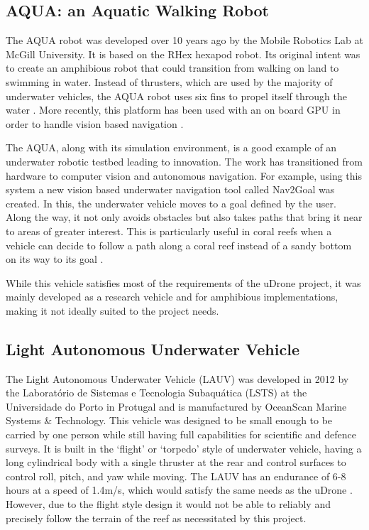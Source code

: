 \subsection{AQUA: an Aquatic Walking Robot}

The AQUA robot was developed over 10 years ago by the  Mobile Robotics Lab at McGill University. It is based on the RHex hexapod robot. Its original intent was to create an amphibious robot that could transition from walking on land to swimming in water. Instead of thrusters, which are used by the majority of underwater vehicles, the AQUA robot uses six fins to propel itself through the water \parencite{aqua}. More recently, this platform has been used with an on board GPU in order to handle vision based navigation \parencite{MandersonGPU}.

The AQUA, along with its simulation environment, is a good example of an underwater robotic testbed leading to innovation. The work has transitioned from hardware to computer vision and autonomous navigation. For example, using this system a new vision based underwater navigation tool called Nav2Goal was created. In this, the underwater vehicle moves to a goal defined by the user. Along the way, it not only avoids obstacles but also takes paths that bring it near to areas of greater interest. This is particularly useful in coral reefs when a vehicle can decide to follow a path along a coral reef instead of a sandy bottom on its way to its goal \parencite{manderson2020visionbased}.

While this vehicle satisfies most of the requirements of the uDrone project, it was mainly developed as a research vehicle and for amphibious implementations, making it not ideally suited to the project needs. 

\subsection{Light Autonomous Underwater Vehicle}
The Light Autonomous Underwater Vehicle (LAUV) was developed in 2012 by the Laboratório de Sistemas e Tecnologia Subaquática (LSTS) at the Universidade do Porto in Protugal and is manufactured by OceanScan Marine Systems \& Technology. This vehicle was designed to be small enough to be carried by one person while still having full capabilities for scientific and defence surveys. It is built in the ‘flight’ or ‘torpedo’ style of underwater vehicle, having a long cylindrical body with a single thruster at the rear and control surfaces to control roll, pitch, and yaw while moving. The LAUV has an endurance of 6-8 hours at a speed of 1.4m/s, which would satisfy the same needs as the uDrone \parencite{lauv}. However, due to the flight style design it would not be able to reliably and precisely follow the terrain of the reef as necessitated by this project.


